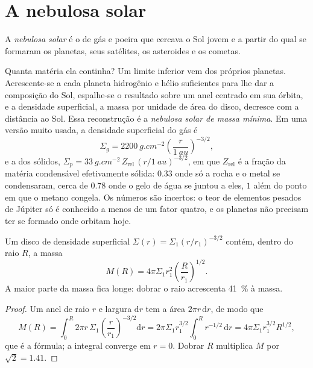 \section{A nebulosa solar}

\begin{definition}\label{def:b2:planet-formation-meteorites:nebula}
A \emph{nebulosa solar} é o  de gás
e poeira que cercava o Sol jovem e a partir do qual se formaram os planetas, seus
satélites, os asteroides e os cometas.
\end{definition}

Quanta matéria ela continha? Um limite inferior vem dos próprios planetas.
Acrescente-se a cada planeta hidrogênio e hélio suficientes para lhe dar a composição do
Sol, espalhe-se o resultado sobre um anel centrado em sua órbita, e a densidade
superficial, a massa por unidade de área do disco, decresce com a distância ao
Sol. Essa reconstrução é a \emph{nebulosa solar de massa
mínima}. Em uma versão muito usada, a densidade
superficial do gás é
\[
  \Sigma_g = \qty{2200}{g.cm^{-2}}\left(\frac{r}{\qty{1}{au}}\right)^{-3/2},
\]
e a dos sólidos, $\Sigma_p = \qty{33}{g.cm^{-2}}\,Z_{\mathrm{rel}}\,
(r/\qty{1}{au})^{-3/2}$, em que $Z_{\mathrm{rel}}$ é a fração da
matéria condensável efetivamente sólida: $0.33$ onde só a rocha e o metal se
condensaram, cerca de $0.78$ onde o gelo de água se juntou a eles, $1$ além do ponto
em que o metano congela. Os números são incertos: o teor de elementos pesados de
Júpiter só é conhecido a menos de um fator quatro, e os planetas não precisam ter
se formado onde orbitam hoje.

\begin{proposition}\label{prop:b2:planet-formation-meteorites:disc-mass}
Um disco de densidade superficial $\Sigma(r) = \Sigma_1 (r/r_1)^{-3/2}$ contém, dentro
do raio $R$, a massa
\[
  M(R) = 4\pi\Sigma_1 r_1^2 \left(\frac{R}{r_1}\right)^{1/2}.
\]
A maior parte da massa fica longe: dobrar o raio acrescenta \qty{41}{\percent} à
massa.
\end{proposition}

\begin{proof}
Um anel de raio $r$ e largura $\mathrm dr$ tem a área $2\pi r\,\mathrm dr$, de modo que
\[
  M(R) = \int_0^R 2\pi r\,\Sigma_1 \left(\frac{r}{r_1}\right)^{-3/2}\mathrm dr
       = 2\pi\Sigma_1 r_1^{3/2}\int_0^R r^{-1/2}\,\mathrm dr
       = 4\pi\Sigma_1 r_1^{3/2} R^{1/2},
\]
que é a fórmula; a integral converge em $r = 0$. Dobrar $R$
multiplica $M$ por $\sqrt 2 = 1.41$.
\end{proof}

